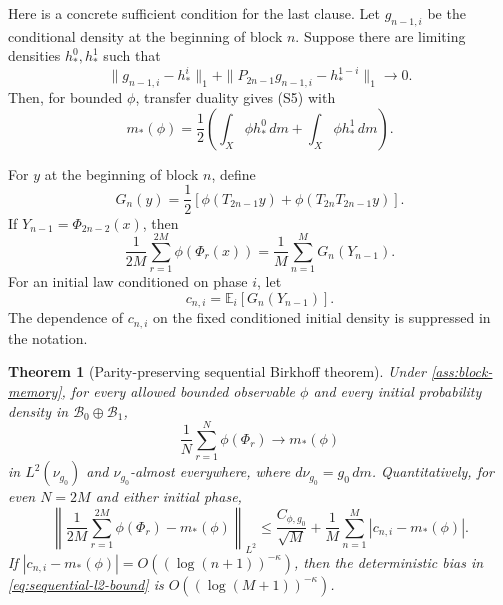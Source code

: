 \documentclass[11pt]{article}
\newtheorem{theorem}{Theorem}[section]
\theoremstyle{definition}
\theoremstyle{remark}
\newcommand{\cB}{\mathcal B}
\newcommand{\EE}{\mathbb E}
\begin{document}
Here is a concrete sufficient condition for the last clause.  Let $g_{n-1,i}$ be the conditional density at the beginning of block $n$.  Suppose there are limiting densities $h_*^0,h_*^1$ such that
\begin{equation}\label{eq:phase-density-convergence}
    \|g_{n-1,i}-h_*^i\|_1
    +\|P_{2n-1}g_{n-1,i}-h_*^{1-i}\|_1
    \longrightarrow0.
\end{equation}
Then, for bounded $\phi$, transfer duality gives (S5) with
\begin{equation}\label{eq:limiting-paired-mean}
    m_*(\phi)
    =\frac12\left(
      \int_X\phi h_*^0\,dm+
      \int_X\phi h_*^1\,dm
    \right).
\end{equation}

For $y$ at the beginning of block $n$, define
\begin{equation}\label{eq:paired-observable}
    G_n(y)=\frac12\left[
      \phi(T_{2n-1}y)
      +\phi(T_{2n}T_{2n-1}y)
    \right].
\end{equation}
If $Y_{n-1}=\Phi_{2n-2}(x)$, then
\begin{equation}\label{eq:pairing-identity}
    \frac1{2M}\sum_{r=1}^{2M}\phi(\Phi_r(x))
    =\frac1M\sum_{n=1}^M G_n(Y_{n-1}).
\end{equation}
For an initial law conditioned on phase $i$, let
\begin{equation}\label{eq:paired-means}
    c_{n,i}=\EE_i[G_n(Y_{n-1})].
\end{equation}
The dependence of $c_{n,i}$ on the fixed conditioned initial density is suppressed in the notation.

\begin{theorem}[Parity-preserving sequential Birkhoff theorem]\label{thm:sequential-birkhoff}
Under \cref{ass:block-memory}, for every allowed bounded observable $\phi$ and every initial probability density in $\cB_0\oplus\cB_1$,
\begin{equation}\label{eq:sequential-l2}
    \frac1N\sum_{r=1}^N\phi(\Phi_r)
    \longrightarrow m_*(\phi)
\end{equation}
in $L^2(\nu_{g_0})$ and $\nu_{g_0}$-almost everywhere, where $d\nu_{g_0}=g_0\,dm$.  Quantitatively, for even $N=2M$ and either initial phase,
\begin{equation}\label{eq:sequential-l2-bound}
    \left\|
      \frac1{2M}\sum_{r=1}^{2M}\phi(\Phi_r)-m_*(\phi)
    \right\|_{L^2}
    \le
    \frac{C_{\phi,g_0}}{\sqrt M}
    +\frac1M\sum_{n=1}^M|c_{n,i}-m_*(\phi)|.
\end{equation}
If $|c_{n,i}-m_*(\phi)|=O((\log(n+1))^{-\kappa})$, then the deterministic bias in \eqref{eq:sequential-l2-bound} is $O((\log(M+1))^{-\kappa})$.
\end{theorem}
\end{document}
